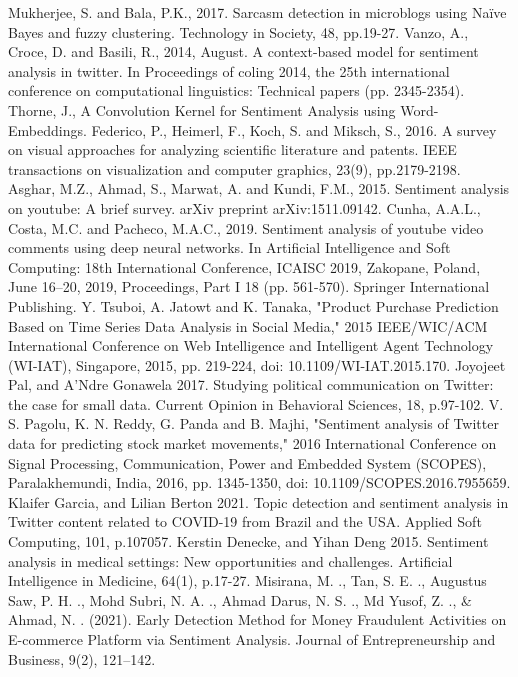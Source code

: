 \documentclass[12pt, conference]{IEEEtran}
\begin{document}
\begin{thebibliography}{00}
   Mukherjee, S. and Bala, P.K., 2017. Sarcasm detection in microblogs using Naïve Bayes and fuzzy clustering. Technology in Society, 48, pp.19-27.
   Vanzo, A., Croce, D. and Basili, R., 2014, August. A context-based model for sentiment analysis in twitter. In Proceedings of coling 2014, the 25th international conference on computational linguistics: Technical papers (pp. 2345-2354).
   Thorne, J., A Convolution Kernel for Sentiment Analysis using Word-Embeddings.
   Federico, P., Heimerl, F., Koch, S. and Miksch, S., 2016. A survey on visual approaches for analyzing scientific literature and patents. IEEE transactions on visualization and computer graphics, 23(9), pp.2179-2198.
   Asghar, M.Z., Ahmad, S., Marwat, A. and Kundi, F.M., 2015. Sentiment analysis on youtube: A brief survey. arXiv preprint arXiv:1511.09142.
   Cunha, A.A.L., Costa, M.C. and Pacheco, M.A.C., 2019. Sentiment analysis of youtube video comments using deep neural networks. In Artificial Intelligence and Soft Computing: 18th International Conference, ICAISC 2019, Zakopane, Poland, June 16–20, 2019, Proceedings, Part I 18 (pp. 561-570). Springer International Publishing.
   Y. Tsuboi, A. Jatowt and K. Tanaka, "Product Purchase Prediction Based on Time Series Data Analysis in Social Media," 2015 IEEE/WIC/ACM International Conference on Web Intelligence and Intelligent Agent Technology (WI-IAT), Singapore, 2015, pp. 219-224, doi: 10.1109/WI-IAT.2015.170.
   Joyojeet Pal, and A'Ndre Gonawela 2017. Studying political communication on Twitter: the case for small data. Current Opinion in Behavioral Sciences, 18, p.97-102.
   V. S. Pagolu, K. N. Reddy, G. Panda and B. Majhi, "Sentiment analysis of Twitter data for predicting stock market movements," 2016 International Conference on Signal Processing, Communication, Power and Embedded System (SCOPES), Paralakhemundi, India, 2016, pp. 1345-1350, doi: 10.1109/SCOPES.2016.7955659.
   Klaifer Garcia, and Lilian Berton 2021. Topic detection and sentiment analysis in Twitter content related to COVID-19 from Brazil and the USA. Applied Soft Computing, 101, p.107057.
   Kerstin Denecke, and Yihan Deng 2015. Sentiment analysis in medical settings: New opportunities and challenges. Artificial Intelligence in Medicine, 64(1), p.17-27.
   Misirana, M. ., Tan, S. E. ., Augustus Saw, P. H. ., Mohd Subri, N. A. ., Ahmad Darus, N. S. ., Md Yusof, Z. ., \& Ahmad, N. . (2021). Early Detection Method for Money Fraudulent Activities on E-commerce Platform via Sentiment Analysis. Journal of Entrepreneurship and Business, 9(2), 121–142.

\end{thebibliography}
\end{document}
